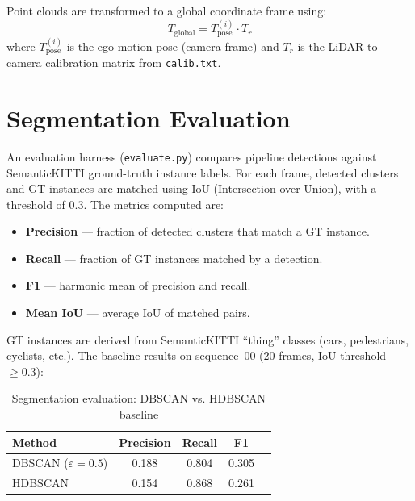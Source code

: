 \documentclass[a4paper, 12pt]{article}
\begin{document}
Point clouds are transformed to a global coordinate frame using:
\begin{equation}
    T_{\text{global}} = T_{\text{pose}}^{(i)} \cdot T_r
\end{equation}
where $T_{\text{pose}}^{(i)}$ is the ego-motion pose (camera frame) and $T_r$ is the LiDAR-to-camera calibration matrix from \texttt{calib.txt}.

\section{Segmentation Evaluation}

An evaluation harness (\texttt{evaluate.py}) compares pipeline detections against SemanticKITTI ground-truth instance labels. For each frame, detected clusters and GT instances are matched using IoU (Intersection over Union), with a threshold of $0.3$. The metrics computed are:

\begin{itemize}[nosep]
    \item \textbf{Precision} --- fraction of detected clusters that match a GT instance.
    \item \textbf{Recall} --- fraction of GT instances matched by a detection.
    \item \textbf{F1} --- harmonic mean of precision and recall.
    \item \textbf{Mean IoU} --- average IoU of matched pairs.
\end{itemize}

GT instances are derived from SemanticKITTI ``thing'' classes (cars, pedestrians, cyclists, etc.). The baseline results on sequence~00 (20 frames, IoU threshold $\geq 0.3$):

\begin{table}[H]
\centering
\caption{Segmentation evaluation: DBSCAN vs. HDBSCAN baseline}
\label{tab:seg-eval}
\begin{tabular}{lcccc}
\toprule
\textbf{Method} & \textbf{Precision} & \textbf{Recall} & \textbf{F1} \\
\midrule
DBSCAN ($\varepsilon=0.5$) & 0.188 & 0.804 & 0.305 \\
HDBSCAN                    & 0.154 & 0.868 & 0.261 \\
\bottomrule
\end{tabular}
\end{table}
\end{document}
